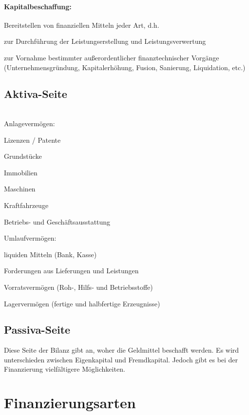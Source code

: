 \paragraph{Kapitalbeschaffung:} Bereitstellen von finanziellen Mitteln jeder Art, d.h.
\begin{compactitem}
	\item zur Durchführung der Leistungserstellung und Leistungsverwertung
	\item zur Vornahme bestimmter außerordentlicher finanztechnischer Vorgänge (Unternehmensgründung, Kapitalerhöhung, Fusion, Sanierung, Liquidation, etc.)
\end{compactitem}

\clearpage
\subsection{Aktiva-Seite}\quad\\
Anlagevermögen:
\begin{compactitem}
	\item Lizenzen / Patente
	\item Grundstücke
	\item Immobilien
	\item Maschinen
	\item Kraftfahrzeuge
	\item Betriebs- und Geschäftsausstattung
\end{compactitem}

Umlaufvermögen:
\begin{compactitem}
	\item liquiden Mitteln (Bank, Kasse)
	\item Forderungen aus Lieferungen und Leistungen
	\item Vorratsvermögen (Roh-, Hilfs- und Betriebsstoffe)
	\item Lagervermögen (fertige und halbfertige Erzeugnisse)
\end{compactitem}

\clearpage
\subsection{Passiva-Seite}
Diese Seite der Bilanz gibt an, woher die Geldmittel beschafft werden. Es wird unterschieden zwischen Eigenkapital und Fremdkapital. Jedoch gibt es bei der Finanzierung vielfältigere Möglichkeiten.

\clearpage
\section{Finanzierungsarten}
